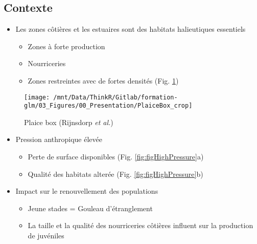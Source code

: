 \documentclass[french,a4paper]{article}
\providecommand{\tightlist}{%
  \setlength{\itemsep}{0pt}\setlength{\parskip}{0pt}}
\begin{document}
\hypertarget{contexte}{%
\subsection{Contexte}\label{contexte}}

\begin{itemize}
\tightlist
\item
  Les zones côtières et les estuaires sont des habitats halieutiques essentiels

  \begin{itemize}
  \tightlist
  \item
    Zones à forte production
  \item
    Nourriceries
  \item
    Zones restreintes avec de fortes densités (Fig. \ref{fig:figPlaiceBox})
  \end{itemize}
\end{itemize}



\begin{figure}[!h]

{\centering \texttt{[image: /mnt/Data/ThinkR/Gitlab/formation-glm/03\_Figures/00\_Presentation/PlaiceBox\_crop]} 

}

\caption{Plaice box (Rijnsdorp \emph{et al.})}\label{fig:figPlaiceBox}
\end{figure}

\begin{itemize}
\tightlist
\item
  Pression anthropique élevée

  \begin{itemize}
  \tightlist
  \item
    Perte de surface disponibles (Fig. \ref{fig:figHighPressure}a)
  \item
    Qualité des habitats alterée (Fig. \ref{fig:figHighPressure}b)
  \end{itemize}
\end{itemize}



\begin{itemize}
\tightlist
\item
  Impact sur le renouvellement des populations

  \begin{itemize}
  \tightlist
  \item
    Jeune stades = Gouleau d'étranglement
  \item
    La taille et la qualité des nourriceries côtières influent sur la production de juvéniles
  \end{itemize}
\end{itemize}
\end{document}
